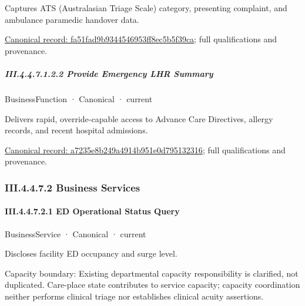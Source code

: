 Captures ATS (Australasian Triage Scale) category, presenting complaint, and ambulance paramedic handover data.


{\footnotesize \href{../../../../continuum/business/business-function/fa51fad9b9344546953ff8ec5b5f39ca.md}{Canonical record: fa51fad9b9344546953ff8ec5b5f39ca}; full qualifications and provenance.}\par
\subparagraph*{III.4.4.7.1.2.2 Provide Emergency LHR Summary}
\label{navigation:III.4.4.7.1.2.2}

\label{element:a7235e8b249a4914b951e0d795132316}
{\small BusinessFunction · Canonical · current}\par

Delivers rapid, override-capable access to Advance Care Directives, allergy records, and recent hospital admissions.


{\footnotesize \href{../../../../continuum/business/business-function/a7235e8b249a4914b951e0d795132316.md}{Canonical record: a7235e8b249a4914b951e0d795132316}; full qualifications and provenance.}\par
\subsubsection*{III.4.4.7.2 Business Services}
\label{navigation:III.4.4.7.2}

\paragraph*{III.4.4.7.2.1 ED Operational Status Query}
\label{navigation:III.4.4.7.2.1}

\label{element:f07828653c06425f9effd92b1d9886c9}
{\small BusinessService · Canonical · current}\par

Discloses facility ED occupancy and surge level.



Capacity boundary: Existing departmental capacity responsibility is clarified, not duplicated. Care-place state contributes to service capacity; capacity coordination neither performs clinical triage nor establishes clinical acuity assertions.


